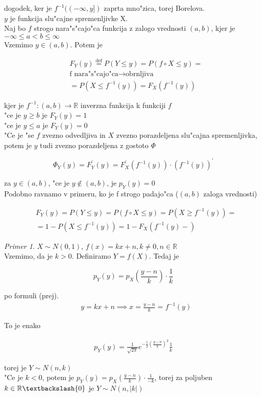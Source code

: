 \documentclass[a4paper,12pt]{article}
\theoremstyle{definition}
\theoremstyle{remark}
\newtheorem*{ex}{Primer}
\newcommand{\R}{\mathbb{R}}
\begin{document}
dogodek, ker je $f^{-1}((-\infty, y])$ zaprta mno"zica, torej Borelova. \\
$y$ je funkcija slu"cajne spremenljivke X. \\
Naj bo $f$ strogo nara"s"cajo"ca funkcija z zalogo vrednosti $(a,b)$, kjer je $-\infty \leq a < b \leq \infty$ \\
Vzemimo $y \in (a,b)$. Potem je

\begin{align*}
    &F_Y(y) \stackrel{\text{def}}{=} P(Y \leq y) = P(f \circ X \leq y) = \\
    &\text{f nara"s"cajo"ca} \to \text{obrnljiva} \\
    &= P(X \leq f^{-1}(y)) = F_X(f^{-1}(y))
\end{align*}

kjer je $f^{-1}: (a,b) \to \R$ inverzna funkcija k funkciji $f$ \\
"ce je $y \geq b$ je $F_Y(y) = 1$ \\
"ce je $y \leq a$ je $F_Y(y) = 0$ \\
"Ce je "se $f$ zvezno odvedljiva in $X$ zvezno porazdeljena slu"cajna spremenljivka, potem je $y$ tudi zvezno
porazdeljena z gostoto $\Phi$

\begin{equation*}
    \Phi_Y(y) = F_Y^{'}(y) = F_X^{'}(f^{-1}(y)) \cdot (f^{-1}(y))^{'}
\end{equation*}

za $y \in (a,b)$, "ce je $y \notin (a,b)$, je $p_Y(y) = 0$ \\
Podobno ravnamo v primeru, ko je f strogo padajo"ca ($(a,b)$ zaloga vrednosti)

\begin{align*}
    &F_Y(y) = P(Y \leq y) = P(f \circ X \leq y) = P(X \geq f^{-1}(y)) = \\
    &= 1 - P(X \leq f^{-1}(y)) = 1 - F_X(f^{-1}(y)-)
\end{align*}

\begin{ex}
    $X \sim N(0,1)$, $f(x) = kx + n, k \neq 0, n \in \R$ \\
    Vzemimo, da je $k > 0$. Definiramo $Y = f(X)$. Tedaj je

    \begin{equation*}
        p_Y(y) = p_X(\frac{y - n}{k}) \cdot \frac{1}{k}
    \end{equation*}

    po formuli (prej).
    \begin{align*}
        &y = kx + n \implies x = \frac{y-n}{k} = f^{-1}(y)
    \end{align*}

    To je enako

    \begin{align*}
        p_Y(y) = \frac{1}{\sqrt{2\pi}} e^{-\frac{1}{2} (\frac{y-n}{k})^2} \frac{1}{k}
    \end{align*}

    torej je $Y \sim N(n, k)$ \\
    "Ce je $k < 0$, potem je $p_Y(y) = p_X(\frac{y-n}{k}) \cdot \frac{1}{-k}$, torej za poljuben
    $k \in \R \textbackslash \{0\}$ je $Y \sim N(n, |k|)$
\end{ex}
\end{document}

